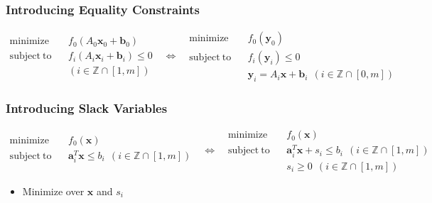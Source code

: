 \subsubsection*{Introducing Equality Constraints}
\begin{equation}\begin{aligned}
    \mathrm{minimize}~~&~~f_0(A_0\mathbf{x}_0 + \mathbf{b}_0) \\
    \mathrm{subject~to}~~&~~f_i(A_i\mathbf{x}_i + \mathbf{b}_i) \leq 0\\
        &~~(i \in \mathbb{Z} \cap [1,m])
\end{aligned}~~~\Leftrightarrow~~~\begin{aligned}
    \mathrm{minimize}~~&~~f_0(\mathbf{y}_0) \\
    \mathrm{subject~to}~~&~~f_i(\mathbf{y}_i) \leq 0 \\
        &~~\mathbf{y}_i = A_i \mathbf{x} + \mathbf{b}_i~~(i \in \mathbb{Z} \cap [0,m])
\end{aligned}\end{equation}

\subsubsection*{Introducing Slack Variables}
\begin{equation}\begin{aligned}
    \mathrm{minimize}~~&~~f_0(\mathbf{x}) \\
    \mathrm{subject~to}~~&~~\mathbf{a}_i^T \mathbf{x} \leq b_i~~(i \in \mathbb{Z} \cap [1,m]) \\ {}
\end{aligned}~~~\Leftrightarrow~~~\begin{aligned}
    \mathrm{minimize}~~&~~f_0(\mathbf{x}) \\
    \mathrm{subject~to}~~&~~\mathbf{a}_i^T \mathbf{x} + s_i \leq b_i~~(i \in \mathbb{Z} \cap [1,m]) \\
        &~~ s_i \geq 0~~(i \in \mathbb{Z} \cap [1,m])
\end{aligned}\end{equation}
\begin{itemize}
    \item Minimize over $\mathbf{x}$ and $s_i$
\end{itemize}

